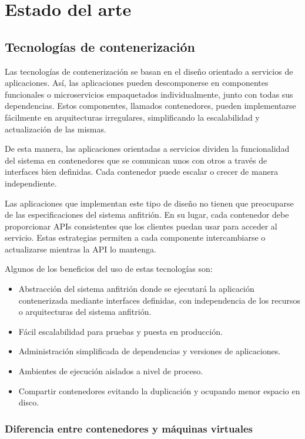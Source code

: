 \chapter{Estado del arte}
\label{cha:state_of_art}


\section{Tecnologías de contenerización}

Las tecnologías de contenerización se basan en el diseño orientado a servicios de aplicaciones. Así, las aplicaciones pueden descomponerse en componentes funcionales o microservicios empaquetados individualmente, junto con todas sus dependencias. Estos componentes, llamados contenedores, pueden implementarse fácilmente en arquitecturas irregulares, simplificando la escalabilidad y actualización de las mismas.

De esta manera, las aplicaciones orientadas a servicios dividen la funcionalidad del sistema en contenedores que se comunican unos con otros a través de interfaces bien definidas. Cada contenedor puede escalar o crecer de manera independiente.

Las aplicaciones que implementan este tipo de diseño no tienen que preocuparse de las especificaciones del sistema anfitrión. En su lugar, cada contenedor debe proporcionar APIs consistentes que los clientes puedan usar para acceder al servicio. Estas estrategias permiten a cada componente intercambiarse o actualizarse mientras la API lo mantenga.

Algunos de los beneficios del uso de estas tecnologías son:
\begin{itemize}
\item Abstracción del sistema anfitrión donde se ejecutará la aplicación contenerizada mediante interfaces definidas, con independencia de los recursos o arquitecturas del sistema anfitrión.
\item Fácil escalabilidad para pruebas y puesta en producción.
\item Administración simplificada de dependencias y versiones de aplicaciones.
\item Ambientes de ejecución aislados a nivel de proceso.
\item Compartir contenedores evitando la duplicación y ocupando menor espacio en disco.
\end{itemize}

\subsection{Diferencia entre contenedores y máquinas virtuales}

